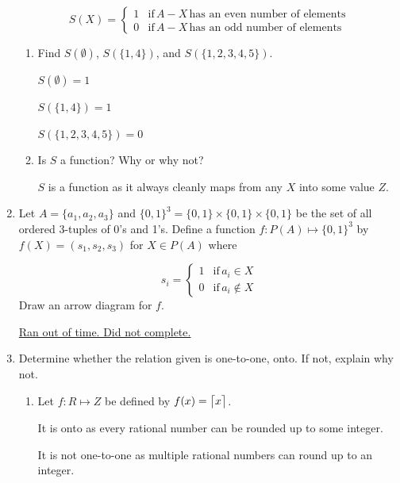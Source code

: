 \documentclass[12pt,letterpaper,titlepage]{article}
\DeclarePairedDelimiter{\ceil}{\lceil}{\rceil}
\begin{document}
\begin{raggedright}
\begin{enumerate}
\begin{equation*}
S(X) = \begin{cases} 
      1 & \text{if}\, A − X\, \text{has an even number of elements} \\
      0 & \text{if}\, A − X\, \text{has an odd number of elements}
   \end{cases}
\end{equation*}

\begin{enumerate}[label=(\alph*)]
\item Find $S(\emptyset)$, $S(\{1, 4\})$, and $S(\{1, 2, 3, 4, 5\})$.

$S(\emptyset) = 1$

$S(\{1, 4\}) = 1$

$S(\{1, 2, 3, 4, 5\}) = 0$
\item Is $S$ a function? Why or why not?

$S$ is a function as it always cleanly maps from any $X$ into some value $Z$.
\end{enumerate}

\clearpage

\item Let $A = \{a_1, a_2, a_3\}$ and $\{0, 1\}^3 = \{0, 1\} \times \{0, 1\} \times \{0, 1\}$ be the set of all ordered 3-tuples of 0’s and 1’s. Define a function $f : P(A) \mapsto \{0, 1\}^3$ by $f(X) = (s_1, s_2, s_3)$ for $X \in P(A)$ where

\begin{equation*}
s_i = \begin{cases} 
      1 & \text{if}\, a_i\in X \\
      0 & \text{if}\, a_i\not\in X
   \end{cases}
\end{equation*}
Draw an arrow diagram for $f$.

\underline{Ran out of time. Did not complete.}

\item Determine whether the relation given is one-to-one, onto. If not, explain why not.

\begin{enumerate}[label=(\alph*)]
\item Let $f : R \mapsto Z$ be defined by $f(x) = \ceil[\big]{x}$.

It is onto as every rational number can be rounded up to some integer. 

It is not one-to-one as multiple rational numbers can round up to an integer.


\end{enumerate}
\end{enumerate}
\end{raggedright}
\end{document}
